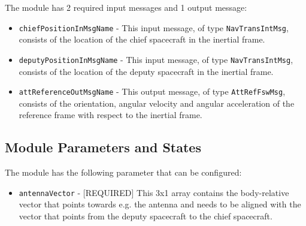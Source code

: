 \documentclass[]{AVSreport}
\begin{document}
The module has 2 required input messages and 1 output message:

\begin{itemize}
    \item {\tt chiefPositionInMsgName} - This input message, of type {\tt NavTransIntMsg}, consists of the location of the chief spacecraft in the inertial frame.
    \item {\tt deputyPositionInMsgName} - This input message, of type {\tt NavTransIntMsg}, consists of the location of the deputy spacecraft in the inertial frame.
    \item {\tt attReferenceOutMsgName} - This output message, of type {\tt AttRefFswMsg}, consists of the orientation, angular velocity and angular acceleration of the reference frame with respect to the inertial frame.
\end{itemize}

\subsection{Module Parameters and States}

The module has the following parameter that can be configured:

\begin{itemize}
    \item {\tt antennaVector} - [REQUIRED] This 3x1 array contains the body-relative vector that points towards e.g. the antenna and needs to be aligned with the vector that points from the deputy spacecraft to the chief spacecraft.
\end{itemize}



\end{document}

